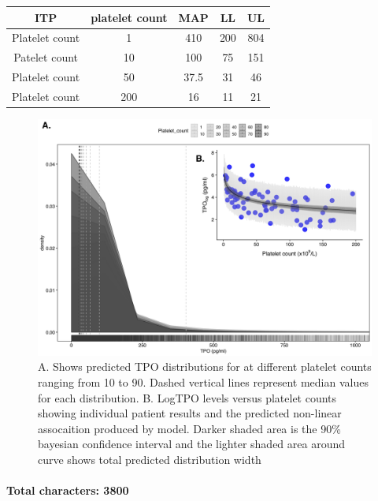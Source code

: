 \documentclass[11pt]{article}
\begin{document}
\begin{center}
 \begin{tabular}{||c c c c c||}
 \hline\hline
  ITP   & platelet count & MAP & LL & UL    \\
\hline\hline
 Platelet count & 1 & 410 & 200  & 804 \\
 \hline
 Patelet count & 10 & 100 &  75 & 151 \\
 \hline
 Platelet count & 50 & 37.5 & 31 & 46 \\
 \hline
 Platelet count & 200 & 16 & 11 & 21 \\ [1ex]
 \hline
\end{tabular}
\end{center}

\begin{figure}
\includegraphics[]{ABSTRACT_v1_graph1.png}
\caption{A. Shows predicted TPO distributions for at different platelet counts ranging from 10 to 90. Dashed vertical lines represent median values for each distribution. B. LogTPO levels versus platelet counts showing individual patient results and the predicted non-linear assocaition produced by model. Darker shaded area is the 90\% bayesian confidence interval and the lighter shaded area around curve shows total predicted distribution width}
\end{figure}





\paragraph{}
\textbf{Total characters: 3800}
\end{document}
